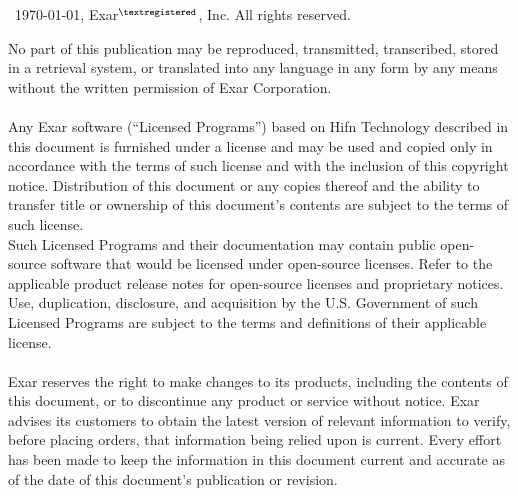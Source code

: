 {\setlength{\baselineskip}{.7\baselineskip}
  {\scriptsize\noindent\DocID{} \textcopyright~\today{}, Exar{\tiny$^{\textregistered}$}{}, Inc.   
  All rights reserved.\hfill\textcolor{lightgray}{\currenttime}\\[.5ex]}

  {\scriptsize\noindent{}No part of this publication may be reproduced, transmitted,
  transcribed, stored in a retrieval system, or translated into any
  language in any form by any means without the written permission of
  Exar Corporation.}\\[.5ex]

  \noindent{\small\textbf{\textcolor{ThemeColor}{Licensing and Government Use}}}\\[.5ex]

  {\scriptsize\noindent{}Any Exar software (“Licensed Programs”) based on Hifn Technology
    described in this document is furnished under a license and may be
    used and copied only in accordance with the terms of such license and
    with the inclusion of this copyright notice. Distribution of this
    document or any copies thereof and the ability to transfer title or
    ownership of this document’s contents are subject to the terms of such
    license.}\\[.5ex]

    {\scriptsize\noindent{}Such Licensed Programs and their documentation may contain public
    open-source software that would be licensed under open-source
    licenses.  Refer to the applicable product release notes for
    open-source licenses and proprietary notices.  Use, duplication,
    disclosure, and acquisition by the U.S. Government of such Licensed
    Programs are subject to the terms and definitions of their applicable
    license.}\\[.5ex]

  \noindent{\small\textbf{\textcolor{ThemeColor}{Disclaimer}}}\\[.5ex]

  {\scriptsize\noindent{}Exar reserves the right to make changes to its products, including the
  contents of this document, or to discontinue any product or service
  without notice. Exar advises its customers to obtain the latest
  version of relevant information to verify, before placing orders, that
  information being relied upon is current. Every effort has been made
  to keep the information in this document current and accurate as of
  the date of this document’s publication or revision.}\\[.5ex]

}
